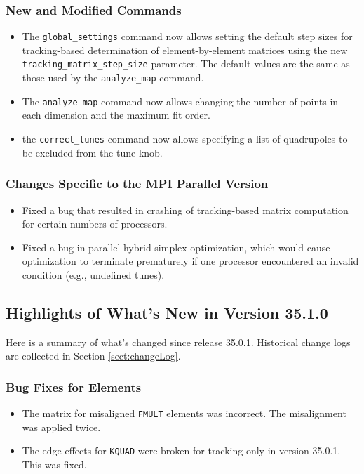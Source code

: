 \documentclass[11pt]{article}
\begin{document}
\subsubsection{New and Modified Commands}
\begin{itemize}
\item The \verb|global_settings| command now allows setting the default step sizes for tracking-based determination
  of element-by-element matrices using the new \verb|tracking_matrix_step_size| parameter. The default values are
  the same as those used by the \verb|analyze_map| command.
\item The \verb|analyze_map| command now allows changing the number of points in each dimension and the maximum fit order.
\item the \verb|correct_tunes| command now allows specifying a list of quadrupoles to be excluded from the tune knob.
\end{itemize}

\subsubsection{Changes Specific to the MPI Parallel Version}

\begin{itemize}
\item Fixed a bug that resulted in crashing of tracking-based matrix computation for certain numbers of processors.
\item Fixed a bug in parallel hybrid simplex optimization, which would cause optimization to terminate prematurely if
  one processor encountered an invalid condition (e.g., undefined tunes).
\end{itemize}

\subsection{Highlights of What's New in Version 35.1.0}

Here is a summary of what's changed since release 35.0.1.
Historical change logs are collected in Section \ref{sect:changeLog}.

\subsubsection{Bug Fixes for Elements}

\begin{itemize}
\item The matrix for misaligned \verb|FMULT| elements was incorrect. The misalignment was applied twice.
\item The edge effects for \verb|KQUAD| were broken for tracking only in version 35.0.1. This was fixed.
\end{itemize}
\end{document}
